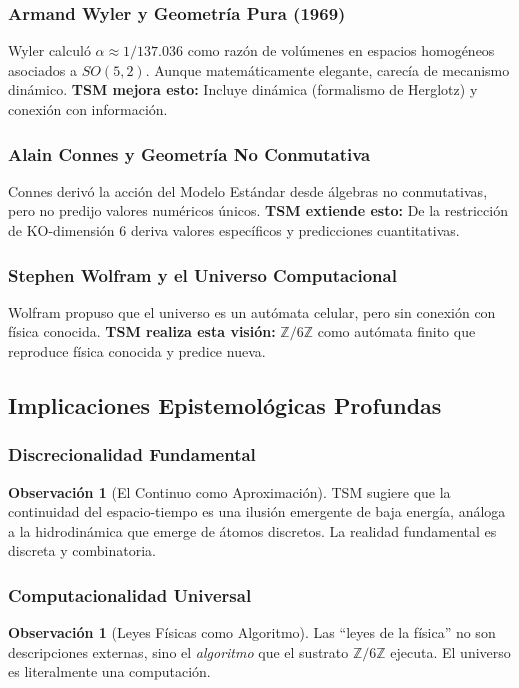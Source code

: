 \documentclass[11pt, a4paper]{article}
\theoremstyle{plain}
\theoremstyle{definition}
\newtheorem{observacion}[teorema]{Observación}
\newcommand{\Zmod}{\mathbb{Z}/6\mathbb{Z}}
\begin{document}
\subsubsection{Armand Wyler y Geometría Pura (1969)}
Wyler calculó $\alpha \approx 1/137.036$ como razón de volúmenes en espacios homogéneos asociados a $SO(5,2)$. Aunque matemáticamente elegante, carecía de mecanismo dinámico. \textbf{TSM mejora esto:} Incluye dinámica (formalismo de Herglotz) y conexión con información.

\subsubsection{Alain Connes y Geometría No Conmutativa}
Connes derivó la acción del Modelo Estándar desde álgebras no conmutativas, pero no predijo valores numéricos únicos. \textbf{TSM extiende esto:} De la restricción de KO-dimensión 6 deriva valores específicos y predicciones cuantitativas.

\subsubsection{Stephen Wolfram y el Universo Computacional}
Wolfram propuso que el universo es un autómata celular, pero sin conexión con física conocida. \textbf{TSM realiza esta visión:} $\Zmod$ como autómata finito que reproduce física conocida y predice nueva.

\subsection{Implicaciones Epistemológicas Profundas}

\subsubsection{Discrecionalidad Fundamental}
\begin{observacion}[El Continuo como Aproximación]
TSM sugiere que la continuidad del espacio-tiempo es una ilusión emergente de baja energía, análoga a la hidrodinámica que emerge de átomos discretos. La realidad fundamental es discreta y combinatoria.
\end{observacion}

\subsubsection{Computacionalidad Universal}
\begin{observacion}[Leyes Físicas como Algoritmo]
Las ``leyes de la física'' no son descripciones externas, sino el \textit{algoritmo} que el sustrato $\Zmod$ ejecuta. El universo es literalmente una computación.
\end{observacion}
\end{document}

